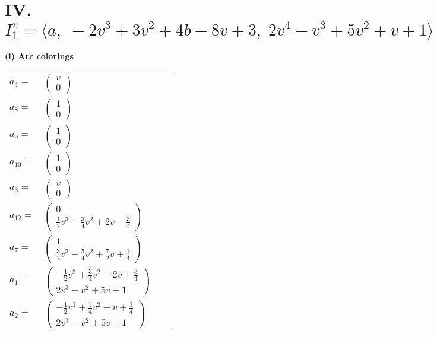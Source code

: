 \documentclass[1p]{elsarticle_modified}
\theoremstyle{definition}
\begin{document}
\centering \section*{IV. $I^v_{1}= \langle a,\;-2 v^3+3 v^2+4 b-8 v+3,\;2 v^4- v^3+5 v^2+v+1 \rangle$}
\flushleft \textbf{(i) Arc colorings}\\
\begin{tabular}{m{7pt} m{180pt} m{7pt} m{180pt} }
\flushright $a_{4}=$&$\begin{pmatrix}v\\0\end{pmatrix}$ \\
\flushright $a_{8}=$&$\begin{pmatrix}1\\0\end{pmatrix}$ \\
\flushright $a_{9}=$&$\begin{pmatrix}1\\0\end{pmatrix}$ \\
\flushright $a_{10}=$&$\begin{pmatrix}1\\0\end{pmatrix}$ \\
\flushright $a_{3}=$&$\begin{pmatrix}v\\0\end{pmatrix}$ \\
\flushright $a_{12}=$&$\begin{pmatrix}0\\\frac{1}{2} v^3-\frac{3}{4} v^2+2 v-\frac{3}{4}\end{pmatrix}$ \\
\flushright $a_{7}=$&$\begin{pmatrix}1\\\frac{3}{2} v^3-\frac{5}{4} v^2+\frac{7}{2} v+\frac{1}{4}\end{pmatrix}$ \\
\flushright $a_{1}=$&$\begin{pmatrix}-\frac{1}{2} v^3+\frac{3}{4} v^2-2 v+\frac{3}{4}\\2 v^3- v^2+5 v+1\end{pmatrix}$ \\
\flushright $a_{2}=$&$\begin{pmatrix}-\frac{1}{2} v^3+\frac{3}{4} v^2- v+\frac{3}{4}\\2 v^3- v^2+5 v+1\end{pmatrix}$ \\

\end{tabular}
\end{document}
